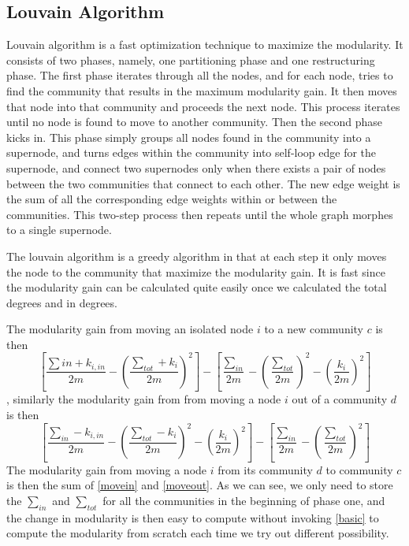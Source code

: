 \subsection{Louvain Algorithm}
Louvain algorithm \cite{blondel2008fast} is a fast optimization technique to maximize the modularity. It consists of two phases, namely, one partitioning phase and one restructuring phase. The first phase iterates through all the nodes, and for each node, tries to find the community that results in the maximum modularity gain. It then moves that node into that community and proceeds the next node. This process iterates until no node is found to move to another community. Then the second phase kicks in. This phase simply groups all nodes found in the community into a supernode, and turns edges within the community into self-loop edge for the supernode, and connect two supernodes only when there exists a pair of nodes between the two communities that connect to each other. The new edge weight is the sum of all the corresponding edge weights within or between the communities. This two-step process then repeats until the whole graph morphes to a single supernode. 

The louvain algorithm is a greedy algorithm in that at each step it only moves the node to the community that maximize the modularity gain. It is fast since the modularity gain can be calculated quite easily once we calculated the total degrees and in degrees.

The modularity gain from moving an isolated node $i$ to a new community $c$ is then
\begin{equation} \label{movein}
    [\frac{\sum in+k_{i,in} }{2m} - {(\frac{\sum_{tot} + k_i}{2m})}^2] - [\frac{\sum_{in}}{2m} - (\frac{\sum_{tot}}{2m})^2 - {(\frac{k_i}{2m})}^2]
\end{equation}, similarly the modularity gain from from moving a node $i$ out of a community $d$ is then
\begin{equation} \label{moveout}
    [\frac{\sum_{in} - k_{i,in}}{2m} - {(\frac{\sum_{tot}-k_i}{2m})}^2 - {(\frac{k_i}{2m})}^2] - [\frac{\sum_{in}}{2m} - {(\frac{\sum_{tot}}{2m})}^2]
\end{equation}
The modularity gain from moving a node $i$ from its community $d$ to community $c$ is then the sum of \ref{movein} and \ref{moveout}. As we can see, we only need to store the $\sum_{in}$ and $\sum_{tot}$ for all the communities in the beginning of phase one, and the change in modularity is then easy to compute without invoking \ref{basic} to compute the modularity from scratch each time we try out different possibility.



